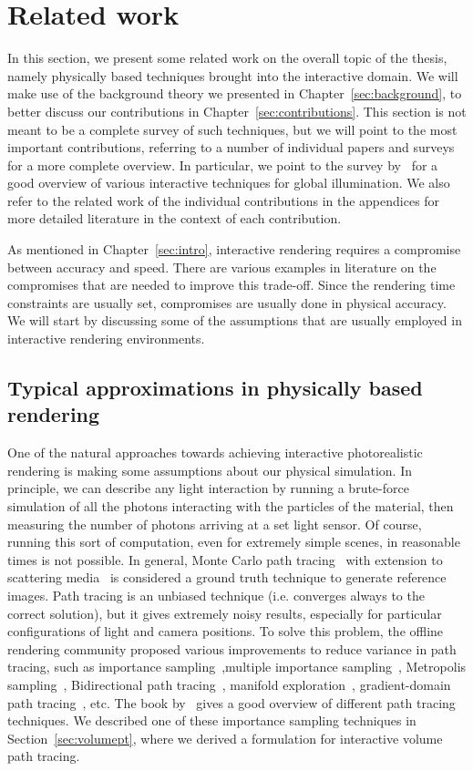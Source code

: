 \chapter{Related work}
%
\label{sec:related}
%
In this section, we present some related work on the overall topic of the thesis, namely physically based techniques brought into the interactive domain. We will make use of the background theory we presented in Chapter~\ref{sec:background}, to better discuss our contributions in Chapter~\ref{sec:contributions}. This section is not meant to be a complete survey of such techniques, but we will point to the most important contributions, referring to a number of individual papers and surveys for a more complete overview. In particular, we point to the survey by~\citet{Ritschel2012} for a good overview of various interactive techniques for global illumination. We also refer to the related work of the individual contributions in the appendices for more detailed literature in the context of each contribution. 

As mentioned in Chapter~\ref{sec:intro}, interactive rendering requires a compromise between accuracy and speed. There are various examples in literature on the compromises that are needed to improve this trade-off. Since the rendering time constraints are usually set, compromises are usually done in physical accuracy. We will start by discussing some of the assumptions that are usually employed in interactive rendering environments. 
%
\section{Typical approximations in physically based rendering}

One of the natural approaches towards achieving interactive photorealistic rendering is making some assumptions about our physical simulation. In principle, we can describe any light interaction by running a brute-force simulation of all the photons interacting with the particles of the material, then measuring the number of photons arriving at a set light sensor. Of course, running this sort of computation, even for extremely simple scenes, in reasonable times is not possible. In general, Monte Carlo path tracing~\cite{Kajiya1986} with extension to scattering media~\cite{Rushmeier1988} is considered a ground truth technique to generate reference images. Path tracing is an unbiased technique (i.e. converges always to the correct solution), but it gives extremely noisy results, especially for particular configurations of light and camera positions. To solve this problem, the offline rendering community proposed various improvements to reduce variance in path tracing, such as importance sampling~\cite{Kirk1991},multiple importance sampling~\cite{Veach1995}, Metropolis sampling~\cite{Veach1995}, Bidirectional path tracing~\cite{Veach1997}, manifold exploration~\cite{Jakob2012}, gradient-domain path tracing~\cite{Kettunen2015}, etc. The book by~\citet{Pharr2017} gives a good overview of different path tracing techniques. We described one of these importance sampling techniques in Section~\ref{sec:volumept}, where we derived a formulation for interactive volume path tracing.

